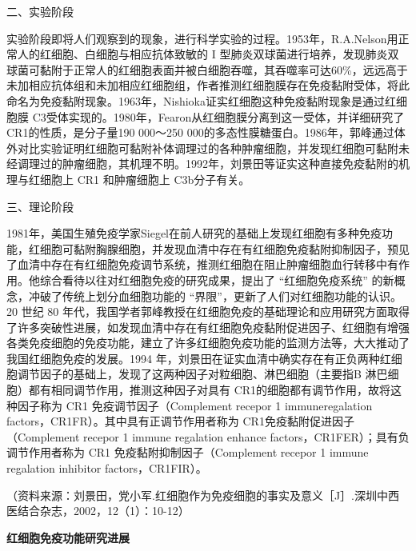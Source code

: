 \begin{center}
{\large 二、实验阶段}
\end{center}

实验阶段即将人们观察到的现象，进行科学实验的过程。1953年，R.A.Nelson用正常人的红细胞、白细胞与相应抗体致敏的
I
型肺炎双球菌进行培养，发现肺炎双球菌可黏附于正常人的红细胞表面并被白细胞吞噬，其吞噬率可达60\%，远远高于未加相应抗体组和未加相应红细胞组，作者推测红细胞膜存在免疫黏附受体，将此命名为免疫黏附现象。1963年，Nishioka证实红细胞这种免疫黏附现象是通过红细胞膜
C3受体实现的。1980年，Fearon从红细胞膜分离到这一受体，并详细研究了CR1的性质，是分子量190
000～250
000的多态性膜糖蛋白。1986年，郭峰通过体外对比实验证明红细胞可黏附补体调理过的各种肿瘤细胞，并发现红细胞可黏附未经调理过的肿瘤细胞，其机理不明。1992年，刘景田等证实这种直接免疫黏附的机理与红细胞上
CR1 和肿瘤细胞上 C3b分子有关。

\begin{center}
{\large 三、理论阶段}
\end{center}

1981年，美国生殖免疫学家Siegel在前人研究的基础上发现红细胞有多种免疫功能，红细胞可黏附胸腺细胞，并发现血清中存在有红细胞免疫黏附抑制因子，预见了血清中存在有红细胞免疫调节系统，推测红细胞在阻止肿瘤细胞血行转移中有作用。他综合看待以往对红细胞免疫的研究成果，提出了
“红细胞免疫系统” 的新概念，冲破了传统上划分血细胞功能的
“界限”，更新了人们对红细胞功能的认识。20 世纪 80
年代，我国学者郭峰教授在红细胞免疫的基础理论和应用研究方面取得了许多突破性进展，如发现血清中存在有红细胞免疫黏附促进因子、红细胞有增强各类免疫细胞的免疫功能，建立了许多红细胞免疫功能的监测方法等，大大推动了我国红细胞免疫的发展。1994
年，刘景田在证实血清中确实存在有正负两种红细胞调节因子的基础上，发现了这两种因子对粒细胞、淋巴细胞（主要指B
淋巴细胞）都有相同调节作用，推测这种因子对具有
CR1的细胞都有调节作用，故将这种因子称为 CR1 免疫调节因子（Complement
recepor 1 immuneregalation factors，CR1FR）。其中具有正调节作用者称为
CR1免疫黏附促进因子（Complement recepor 1 immune regalation enhance
factors，CR1FER）；具有负调节作用者称为 CR1 免疫黏附抑制因子（Complement
recepor 1 immune regalation inhibitor factors，CR1FIR）。

（资料来源：刘景田，党小军.红细胞作为免疫细胞的事实及意义［J］.深圳中西医结合杂志，2002，12（1）：10-12）

\begin{center}
\textbf{\Large 红细胞免疫功能研究进展}
\end{center}

